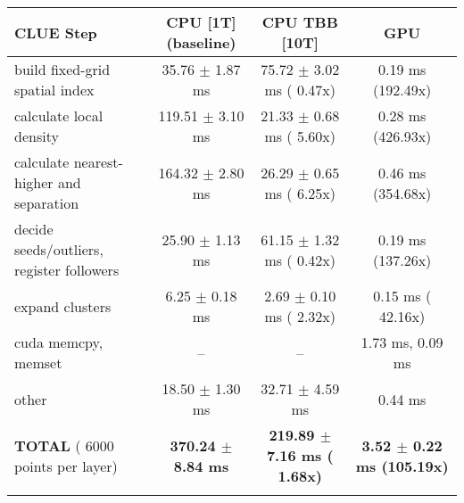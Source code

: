     \begin{tabular}{l|c|c|c}
    \hline
    CLUE Step                                 & CPU [1T] (baseline)         & CPU TBB [10T]                         & GPU                       \\ \hline
    build fixed-grid spatial index            &  35.76 $\pm$  1.87 ms       &  75.72 $\pm$  3.02 ms ( 0.47x)        &   0.19 ms (192.49x)       \\
    calculate local density                   & 119.51 $\pm$  3.10 ms       &  21.33 $\pm$  0.68 ms ( 5.60x)        &   0.28 ms (426.93x)       \\
    calculate nearest-higher and separation   & 164.32 $\pm$  2.80 ms       &  26.29 $\pm$  0.65 ms ( 6.25x)        &   0.46 ms (354.68x)       \\
    decide seeds/outliers, register followers &  25.90 $\pm$  1.13 ms       &  61.15 $\pm$  1.32 ms ( 0.42x)        &   0.19 ms (137.26x)       \\
    expand clusters                           &   6.25 $\pm$  0.18 ms       &   2.69 $\pm$  0.10 ms ( 2.32x)        &   0.15 ms ( 42.16x)       \\ \hline
    cuda memcpy, memset                       & --                          & --                                    &   1.73 ms,   0.09 ms      \\ 
    other                                     &  18.50 $\pm$  1.30 ms       &  32.71 $\pm$  4.59 ms                 &   0.44 ms                 \\ \hline
    \textbf{TOTAL} ( 6000 points per layer)   & \textbf{370.24 $\pm$  8.84 ms} & \textbf{219.89 $\pm$  7.16 ms ( 1.68x)} & \textbf{  3.52 $\pm$  0.22 ms (105.19x)}  \\
    \hline
    \multicolumn{4}{c}{} 
    \end{tabular}
    \linebreak



